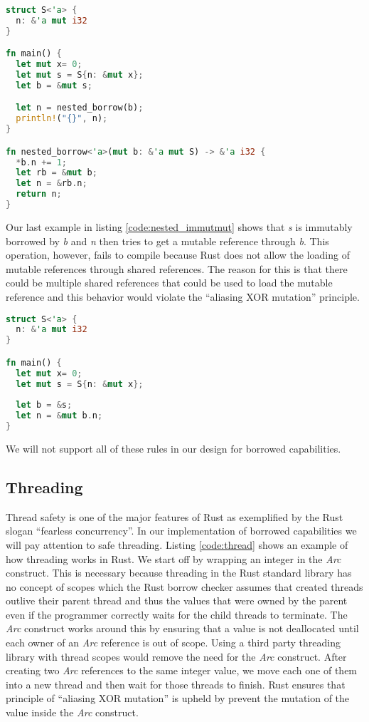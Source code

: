 \begin{lstlisting}[language=Rust,frame=single,caption=Reborrow Example,label=code:nested_lifetime]
struct S<'a> {
  n: &'a mut i32
}

fn main() {
  let mut x= 0;
  let mut s = S{n: &mut x};
  let b = &mut s;

  let n = nested_borrow(b);
  println!("{}", n);
}

fn nested_borrow<'a>(mut b: &'a mut S) -> &'a i32 {
  *b.n += 1;
  let rb = &mut b;
  let n = &rb.n;
  return n;
}
\end{lstlisting}

Our last example in listing \ref{code:nested_immutmut} shows that \textit{s} is immutably borrowed by \textit{b} and \textit{n} then tries to get a mutable reference through \textit{b}.
This operation, however, fails to compile because Rust does not allow the loading of mutable references through shared references.
The reason for this is that there could be multiple shared references that could be used to load the mutable reference and this behavior would violate the ``aliasing XOR mutation'' principle.
\begin{lstlisting}[language=Rust,frame=single,caption=Mutable reference through shared borrow,label=code:nested_immutmut]
struct S<'a> {
  n: &'a mut i32
}

fn main() {
  let mut x= 0;
  let mut s = S{n: &mut x};
    
  let b = &s;
  let n = &mut b.n;
}
\end{lstlisting}

We will not support all of these rules in our design for borrowed capabilities.

\subsection{Threading}
Thread safety is one of the major features of Rust as exemplified by the Rust slogan ``fearless concurrency''.
In our implementation of borrowed capabilities we will pay attention to safe threading.
Listing \ref{code:thread} shows an example of how threading works in Rust.
We start off by wrapping an integer in the \textit{Arc} construct.
This is necessary because threading in the Rust standard library has no concept of scopes which the Rust borrow checker assumes that created threads outlive their parent thread and thus the values that were owned by the parent even if the programmer correctly waits for the child threads to terminate.
The \textit{Arc} construct works around this by ensuring that a value is not deallocated until each owner of an \textit{Arc} reference is out of scope.
Using a third party threading library with thread scopes would remove the need for the \textit{Arc} construct.
After creating two \textit{Arc} references to the same integer value, we move each one of them into a new thread and then wait for those threads to finish.
Rust ensures that principle of ``aliasing XOR mutation'' is upheld by prevent the mutation of the value inside the \textit{Arc} construct.

